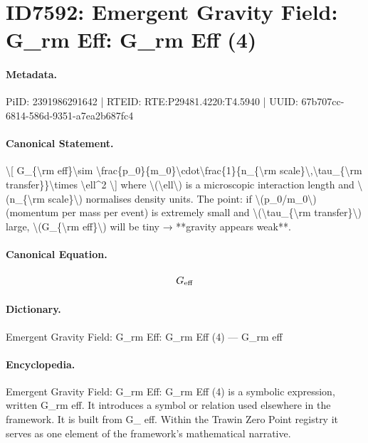\section*{ID7592: Emergent Gravity Field: G\_rm Eff: G\_rm Eff (4)}
\paragraph{Metadata.}
PiID: 2391986291642 | RTEID: RTE:P29481.4220:T4.5940 | UUID: 67b707cc-6814-586d-9351-a7ea2b687fc4

\paragraph{Canonical Statement.}
\textbackslash{}[ G\_\{\textbackslash{}rm eff\}\textbackslash{}sim \textbackslash{}frac\{p\_0\}\{m\_0\}\textbackslash{}cdot\textbackslash{}frac\{1\}\{n\_\{\textbackslash{}rm scale\}\textbackslash{},\textbackslash{}tau\_\{\textbackslash{}rm transfer\}\}\textbackslash{}times \textbackslash{}ell\textasciicircum{}2 \textbackslash{}] where \textbackslash{}(\textbackslash{}ell\textbackslash{}) is a microscopic interaction length and \textbackslash{}(n\_\{\textbackslash{}rm scale\}\textbackslash{}) normalises density units. The point: if \textbackslash{}(p\_0/m\_0\textbackslash{}) (momentum per mass per event) is extremely small and \textbackslash{}(\textbackslash{}tau\_\{\textbackslash{}rm transfer\}\textbackslash{}) large, \textbackslash{}(G\_\{\textbackslash{}rm eff\}\textbackslash{}) will be tiny → **gravity appears weak**.

\paragraph{Canonical Equation.}
\[
G_{\rm eff}
\]

\paragraph{Dictionary.}
Emergent Gravity Field: G\_rm Eff: G\_rm Eff (4) — G\_rm eff

\paragraph{Encyclopedia.}
Emergent Gravity Field: G\_rm Eff: G\_rm Eff (4) is a symbolic expression, written G\_rm eff. It introduces a symbol or relation used elsewhere in the framework. It is built from G\_ eff. Within the Trawin Zero Point registry it serves as one element of the framework's mathematical narrative.
